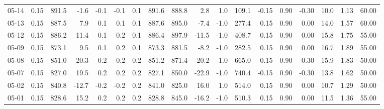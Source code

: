 \begin{threeparttable}
{\begin{tabular}{lrrrrrrrrrrrrrrrrr}
  05-14 &     0.15 & 891.5 &              -1.6 &              -0.1 &               -0.1 &                0.1 & 891.6 & 888.8 &        2.8 &                      1.0 &               109.1 &      -0.15 &      0.90 &          -0.30 &             10.0 &            1.13 &                  60.00 \\
  05-13 &     0.15 & 887.5 &               7.9 &               0.1 &                0.1 &                0.1 & 887.6 & 895.0 &       -7.4 &                     -1.0 &               277.4 &       0.15 &      0.90 &           0.00 &             14.0 &            1.57 &                  60.00 \\
  05-12 &     0.15 & 886.2 &              11.4 &               0.1 &                0.2 &                0.1 & 886.4 & 897.9 &      -11.5 &                     -1.0 &               408.7 &       0.15 &      0.90 &           0.00 &             15.8 &            1.75 &                  55.00 \\
  05-09 &     0.15 & 873.1 &               9.5 &               0.1 &                0.2 &                0.1 & 873.3 & 881.5 &       -8.2 &                     -1.0 &               282.5 &       0.15 &      0.90 &           0.00 &             16.7 &            1.89 &                  55.00 \\
  05-08 &     0.15 & 851.0 &              20.3 &               0.2 &                0.2 &                0.2 & 851.2 & 871.4 &      -20.2 &                     -1.0 &               665.0 &       0.15 &      0.90 &           0.30 &             15.9 &            1.83 &                  50.00 \\
  05-07 &     0.15 & 827.0 &              19.5 &               0.2 &                0.2 &                0.2 & 827.1 & 850.0 &      -22.9 &                     -1.0 &               740.4 &      -0.15 &      0.90 &          -0.30 &             13.8 &            1.62 &                  50.00 \\
  05-02 &     0.15 & 840.8 &             -12.7 &              -0.2 &               -0.2 &                0.2 & 841.0 & 825.0 &       16.0 &                      1.0 &               514.0 &       0.15 &      0.90 &           0.00 &             10.7 &            1.29 &                  50.00 \\
  05-01 &     0.15 & 828.6 &              15.2 &               0.2 &                0.2 &                0.2 & 828.8 & 845.0 &      -16.2 &                     -1.0 &               510.3 &       0.15 &      0.90 &           0.00 &             11.5 &            1.36 &                  55.00 \\

\end{tabular}}
\end{threeparttable}
